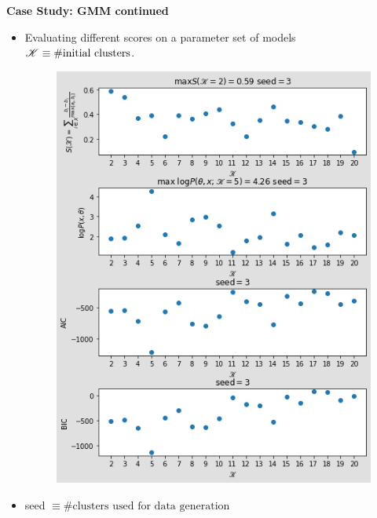 \begin{frame} [t] 
      {\bf Case Study: GMM continued}
\begin{itemize} 
\item Evaluating different scores on a parameter set of models 
      $\mathscr {K} \equiv \#\text{initial clusters}$.
  \begin{figure}
    \centering
    \includegraphics [width=0.30 \textwidth] 
    {gmm_results/gmm_compare_scores.png}
  \end{figure}
\item seed $\equiv \# \text{clusters used for data generation}$ 
\end{itemize}   
\end{frame}

